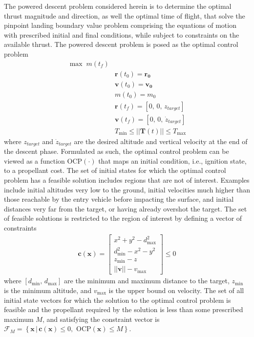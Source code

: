 \documentclass[letterpaper, preprint, paper,11pt]{AAS}
\begin{document}
The powered descent problem considered herein is to determine the optimal thrust magnitude and direction, as well the optimal time of flight, that solve the pinpoint landing boundary value problem comprising the equations of motion with prescribed initial and final conditions, while subject to constraints on the available thrust. The powered descent problem is posed as the optimal control problem
\begin{align}
\max \;m(t_f) \label{eq_srp_ocp}\\
&\mathbf{r}(t_0) = \mathbf{r_0} \\
&\mathbf{v}(t_0) = \mathbf{v_0} \\
&m(t_0) = m_0\\
&\mathbf{r}(t_f) = [0,\, 0,\, z_{target}] \\
&\mathbf{v}(t_f) = [0,\, 0,\, \dot{z}_{target}] \\
&T_{\min} \le ||\mathbf{T}(t)|| \le T_{\max}
\end{align}
where $z_{target}$ and $\dot{z}_{target}$ are the desired altitude and vertical velocity at the end of the descent phase. Formulated as such, the optimal control problem can be viewed as a function $\mathrm{OCP}(\cdot)$ that maps an initial condition, i.e., ignition state, to a propellant cost. 
The set of initial states for which the optimal control problem has a feasible solution includes regions that are not of interest. Examples include initial altitudes very low to the ground, initial velocities much higher than those reachable by the entry vehicle before impacting the surface, and initial distances very far from the target, or having already overshot the target. The set of feasible solutions is restricted to the region of interest by defining a vector of constraints
\begin{align}
\mathbf{c}(\mathbf{x}) = \left[ \begin{array}{lc}
        x^2 + y^2 - d^2_{\max}\\
        d^2_{\min} - x^2 - y^2\\
        z_{\min} - z \\
        ||\textbf{v}|| - v_{\max}
        \end{array} \right] \le 0\label{eq_constraints}%
\end{align} 
where $[d_{\min},\,d_{\max}]$ are the minimum and maximum distance to the target, $z_{\min}$ is the minimum altitude, and $v_{\max}$ is the upper bound on velocity. 
The set of all initial state vectors for which the solution to the optimal control problem is feasible and the propellant required by the solution is less than some prescribed maximum $ M $, and satisfying the constraint vector is $\mathcal{F}_{M} = \left\{\mathbf{x}\,|\, \mathbf{c}(\mathbf{x})\le 0,\,\,\mathrm{OCP}(\mathbf{x}) \le M \right\}$. 
\end{document}
